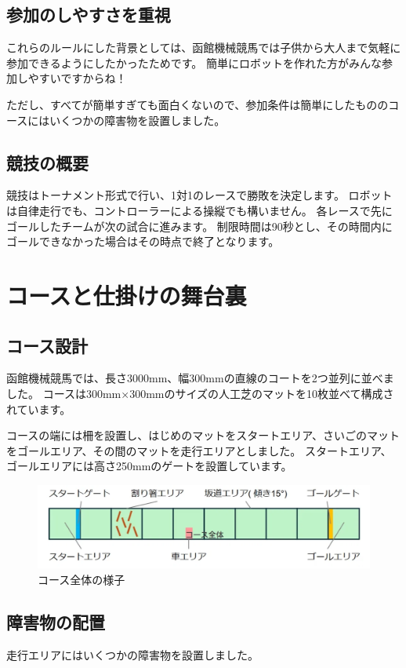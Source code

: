 \section{参加のしやすさを重視}
これらのルールにした背景としては、函館機械競馬では子供から大人まで気軽に参加できるようにしたかったためです。  
簡単にロボットを作れた方がみんな参加しやすいですからね！

ただし、すべてが簡単すぎても面白くないので、参加条件は簡単にしたもののコースにはいくつかの障害物を設置しました。

\section{競技の概要}
競技はトーナメント形式で行い、1対1のレースで勝敗を決定します。  
ロボットは自律走行でも、コントローラーによる操縦でも構いません。  
各レースで先にゴールしたチームが次の試合に進みます。  
制限時間は90秒とし、その時間内にゴールできなかった場合はその時点で終了となります。

\chapter{コースと仕掛けの舞台裏}
\section{コース設計}
函館機械競馬では、長さ3000mm、幅300mmの直線のコートを2つ並列に並べました。  
コースは300mm×300mmのサイズの人工芝のマットを10枚並べて構成されています。

コースの端には柵を設置し、はじめのマットをスタートエリア、さいごのマットをゴールエリア、その間のマットを走行エリアとしました。  
スタートエリア、ゴールエリアには高さ250mmのゲートを設置しています。

\begin{figure}[h]
\centering
\includegraphics[width=0.7\linewidth]{pages/images/course-layout.png}
\caption{コース全体の様子}
\end{figure}

\section{障害物の配置}
走行エリアにはいくつかの障害物を設置しました。

